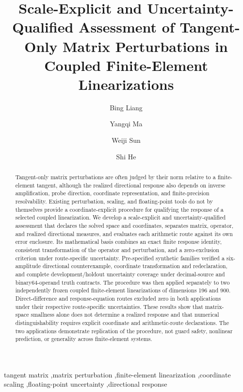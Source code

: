\documentclass[preprint,12pt]{elsarticle}
\begin{document}
\begin{frontmatter}

\title{Scale-Explicit and Uncertainty-Qualified Assessment of Tangent-Only Matrix Perturbations in Coupled Finite-Element Linearizations}
\author[aff1]{Bing Liang}
\author[aff1]{Yangqi Ma}
\author[aff1]{Weiji Sun}
\author[aff2]{Shi He}
\address[aff1]{School of Mechanics and Engineering, Liaoning Technical University, No. 47 Zhonghua Road, Fuxin, Liaoning 123000, China}
\address[aff2]{China Coal Research Institute, Beijing 100013, China}

\begin{abstract}
Tangent-only matrix perturbations are often judged by their norm relative to a finite-element tangent, although the realized directional response also depends on inverse amplification, probe direction, coordinate representation, and finite-precision resolvability. Existing perturbation, scaling, and floating-point tools do not by themselves provide a coordinate-explicit procedure for qualifying the response of a selected coupled linearization. We develop a scale-explicit and uncertainty-qualified assessment that declares the solved space and coordinates, separates matrix, operator, and realized directional measures, and evaluates each arithmetic route against its own error enclosure. Its mathematical basis combines an exact finite response identity, consistent transformation of the operator and perturbation, and a zero-exclusion criterion under route-specific uncertainty. Pre-specified synthetic families verified a six-amplitude directional counterexample, coordinate transformation and redeclaration, and complete development/holdout uncertainty coverage under decimal-source and binary64-operand truth contracts. The procedure was then applied separately to two independently frozen coupled finite-element linearizations of dimensions 196 and 900. Direct-difference and response-equation routes excluded zero in both applications under their respective route-specific uncertainties. These results show that matrix-space smallness alone does not determine a realized response and that numerical distinguishability requires explicit coordinate and arithmetic-route declarations. The two applications demonstrate replication of the procedure, not guard safety, nonlinear prediction, or generality across finite-element systems.
\end{abstract}

\begin{keyword}
tangent matrix \sep matrix perturbation \sep finite-element linearization \sep coordinate scaling \sep floating-point uncertainty \sep directional response
\end{keyword}

\end{frontmatter}
\linenumbers
\end{document}
